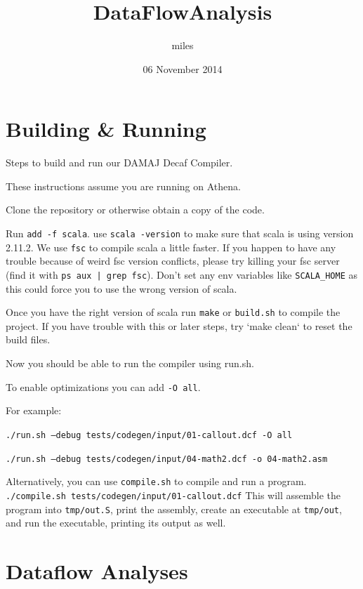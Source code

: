\documentclass[11pt]{article}
\title{DataFlowAnalysis}
\author{miles}
\date{06 November 2014}
\begin{document}
\maketitle

\setcounter{tocdepth}{3}
\tableofcontents
\vspace*{1cm}
\section{Building \& Running}
\label{sec-1}

  Steps to build and run our DAMAJ Decaf Compiler.
  
  These instructions assume you are running on Athena.
  
  Clone the repository or otherwise obtain a copy of the code.

  Run \texttt{add -f scala}. use \texttt{scala -version} to make sure that scala is using version 2.11.2.
  We use \texttt{fsc} to compile scala a little faster. If you happen to have any trouble because of weird
  fsc version conflicts, please try killing your fsc server (find it with \texttt{ps aux | grep fsc}).
  Don't set any env variables like \texttt{SCALA\_HOME} as this could force you to use the wrong version
  of scala.
  
  Once you have the right version of scala run \texttt{make} or \texttt{build.sh} to compile the project.
  If you have trouble with this or later steps, try `make clean` to reset the build files.
  
  Now you should be able to run the compiler using run.sh.

  To enable optimizations you can add \texttt{-O all}.

  For example:

  \texttt{./run.sh --debug tests/codegen/input/01-callout.dcf -O all}

  \texttt{./run.sh --debug tests/codegen/input/04-math2.dcf -o 04-math2.asm}

  Alternatively, you can use \texttt{compile.sh} to compile and run a program.
  \texttt{./compile.sh tests/codegen/input/01-callout.dcf}
  This will assemble the program into \texttt{tmp/out.S}, print the assembly, create an executable at \texttt{tmp/out},
  and run the executable, printing its output as well.

\section{Dataflow Analyses}
\label{sec-2}
\end{document}
